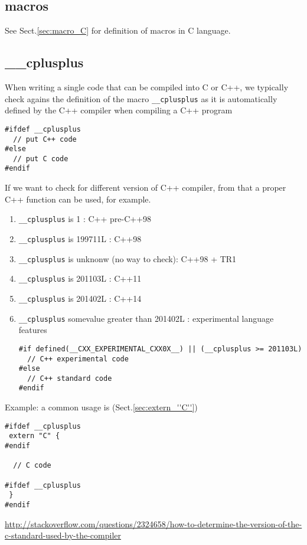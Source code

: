 \subsection{macros}

See Sect.\ref{sec:macro_C} for definition of macros in C language.


\subsection{\_\_cplusplus}
\label{sec:__cplusplus}

When writing a single code that can be compiled into C or C++, we typically
check agains the definition of the macro
\verb!__cplusplus! as it is automatically defined by the C++ compiler when
compiling a C++ program
\begin{verbatim}
#ifdef __cplusplus 
  // put C++ code
#else
  // put C code
#endif
\end{verbatim}

If we want to check for different version of C++ compiler, from that a proper
C++ function can be used, for example.
\begin{enumerate}
  \item \verb!__cplusplus! is 1 : C++ pre-C++98
  \item \verb!__cplusplus! is 199711L : C++98
  \item \verb!__cplusplus! is unknonw (no way to check): C++98 + TR1
  
  \item \verb!__cplusplus! is 201103L : C++11
  \item \verb!__cplusplus! is 201402L : C++14
  \item \verb!__cplusplus! somevalue greater than 201402L : experimental
  language features
\begin{verbatim}
#if defined(__CXX_EXPERIMENTAL_CXX0X__) || (__cplusplus >= 201103L)
  // C++ experimental code
#else
  // C++ standard code
#endif
\end{verbatim}
\end{enumerate}

Example:  a common usage is (Sect.\ref{sec:extern_''C''})
\begin{verbatim}
#ifdef __cplusplus
 extern "C" {
#endif

  // C code
  
#ifdef __cplusplus
 }
#endif
\end{verbatim}

\url{http://stackoverflow.com/questions/2324658/how-to-determine-the-version-of-the-c-standard-used-by-the-compiler}

